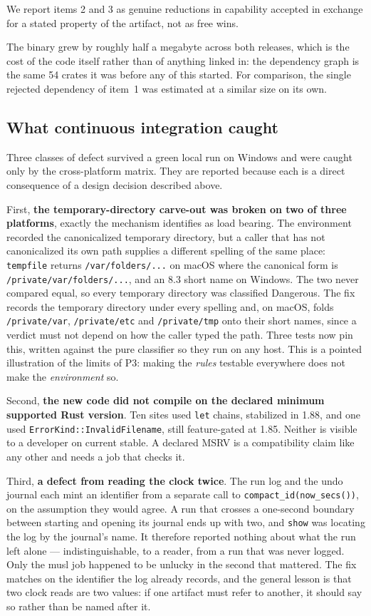 \documentclass[11pt,a4paper]{article}
\newcommand{\code}[1]{\texttt{\small #1}}
\begin{document}
We report items 2 and 3 as genuine reductions in capability accepted in exchange for a
stated property of the artifact, not as free wins.

The binary grew by roughly half a megabyte across both releases, which is the
cost of the code itself rather than of anything linked in: the dependency
graph is the same 54 crates it was before any of this started. For comparison,
the single rejected dependency of item~1 was estimated at a similar size on
its own.

\subsection{What continuous integration caught}
\label{sec:eval:ci}

Three classes of defect survived a green local run on Windows and were caught only
by the cross-platform matrix. They are reported because each is a direct consequence
of a design decision described above.

First, \textbf{the temporary-directory carve-out was broken on two of three
platforms}, exactly the mechanism  identifies as load bearing. The
environment recorded the canonicalized temporary directory, but a caller that has not
canonicalized its own path supplies a different spelling of the same place:
\code{tempfile} returns \code{/var/folders/...} on macOS where the canonical form is
\code{/private/var/folders/...}, and an 8.3 short name on Windows. The two never
compared equal, so every temporary directory was classified \textsf{Dangerous}. The
fix records the temporary directory under every spelling and, on macOS, folds
\code{/private/var}, \code{/private/etc} and \code{/private/tmp} onto their short
names, since a verdict must not depend on how the caller typed the path. Three tests
now pin this, written against the pure classifier so they run on any host. This is a
pointed illustration of the limits of P3: making the \emph{rules} testable everywhere
does not make the \emph{environment} so.

Second, \textbf{the new code did not compile on the declared minimum supported Rust
version}. Ten sites used \code{let} chains, stabilized in 1.88, and one used
\code{ErrorKind::InvalidFilename}, still feature-gated at 1.85. Neither is visible to
a developer on current stable. A declared MSRV is a compatibility claim like any
other and needs a job that checks it.

Third, \textbf{a defect from reading the clock twice}. The run log and the
undo journal each mint an identifier from a separate call to
\code{compact\_id(now\_secs())}, on the assumption they would agree. A run that
crosses a one-second boundary between starting and opening its journal ends up
with two, and \code{show} was locating the log by the journal's name. It
therefore reported nothing about what the run left alone --- indistinguishable,
to a reader, from a run that was never logged. Only the musl job happened to be
unlucky in the second that mattered. The fix matches on the identifier the log
already records, and the general lesson is that two clock reads are two values:
if one artifact must refer to another, it should say so rather than be named
after it.
\end{document}
